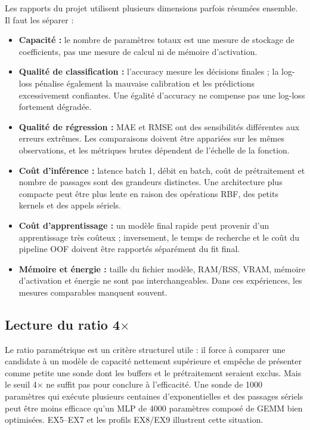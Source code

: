 \documentclass[11pt,a4paper]{article}
\begin{document}
Les rapports du projet utilisent plusieurs dimensions parfois résumées ensemble. Il faut les séparer :
\begin{itemize}
  \item \textbf{Capacité :} le nombre de paramètres totaux est une mesure de stockage de coefficients, pas une mesure de calcul ni de mémoire d'activation.
  \item \textbf{Qualité de classification :} l'accuracy mesure les décisions finales ; la log-loss pénalise également la mauvaise calibration et les prédictions excessivement confiantes. Une égalité d'accuracy ne compense pas une log-loss fortement dégradée.
  \item \textbf{Qualité de régression :} MAE et RMSE ont des sensibilités différentes aux erreurs extrêmes. Les comparaisons doivent être appariées sur les mêmes observations, et les métriques brutes dépendent de l'échelle de la fonction.
  \item \textbf{Coût d'inférence :} latence batch 1, débit en batch, coût de prétraitement et nombre de passages sont des grandeurs distinctes. Une architecture plus compacte peut être plus lente en raison des opérations RBF, des petits kernels et des appels sériels.
  \item \textbf{Coût d'apprentissage :} un modèle final rapide peut provenir d'un apprentissage très coûteux ; inversement, le temps de recherche et le coût du pipeline OOF doivent être rapportés séparément du fit final.
  \item \textbf{Mémoire et énergie :} taille du fichier modèle, RAM/RSS, VRAM, mémoire d'activation et énergie ne sont pas interchangeables. Dans ces expériences, les mesures comparables manquent souvent.
\end{itemize}

\subsection{Lecture du ratio 4\(\times\)}

Le ratio paramétrique est un critère structurel utile : il force à comparer une candidate à un modèle de capacité nettement supérieure et empêche de présenter comme petite une sonde dont les buffers et le prétraitement seraient exclus. Mais le seuil 4\(\times\) ne suffit pas pour conclure à l'efficacité. Une sonde de 1000 paramètres qui exécute plusieurs centaines d'exponentielles et des passages sériels peut être moins efficace qu'un MLP de 4000 paramètres composé de GEMM bien optimisées. EX5--EX7 et les profils EX8/EX9 illustrent cette situation.
\end{document}
